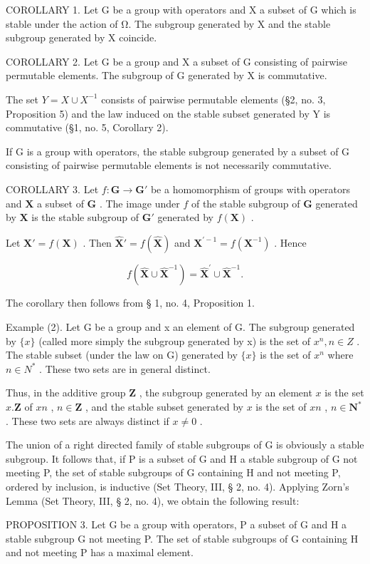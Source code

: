 COROLLARY 1. Let G be a group with operators and X a subset of G which is stable under the action of Ω. The subgroup generated by X and the stable subgroup generated by X coincide.

COROLLARY 2. Let G be a group and X a subset of G consisting of pairwise permutable elements. The subgroup of G generated by X is commutative.

The set \(Y = X \cup X^{-1}\) consists of pairwise permutable elements (§2, no. 3, Proposition 5) and the law induced on the stable subset generated by Y is commutative (§1, no. 5, Corollary 2).

If G is a group with operators, the stable subgroup generated by a subset of G consisting of pairwise permutable elements is not necessarily commutative.

COROLLARY 3. Let \(f: \mathbf{G} \to \mathbf{G}'\) be a homomorphism of groups with operators and \(\mathbf{X}\) a subset of \(\mathbf{G}\) . The image under \(f\) of the stable subgroup of \(\mathbf{G}\) generated by \(\mathbf{X}\) is the stable subgroup of \(\mathbf{G}'\) generated by \(f(\mathbf{X})\) .

Let \(\mathbf{X}' = f(\mathbf{X})\) . Then \(\hat{\mathbf{X}}' = f(\hat{\mathbf{X}})\) and \(\mathbf{X}^{\prime -1} = f(\mathbf{X}^{-1})\) . Hence

\[
f (\hat {\mathbf {X}} \cup \hat {\mathbf {X}} ^ {- 1}) = \hat {\mathbf {X}} ^ {\prime} \cup \hat {\mathbf {X}} ^ {- 1}.
\]

The corollary then follows from § 1, no. 4, Proposition 1.

Example (2). Let G be a group and x an element of G. The subgroup generated by \(\{x\}\) (called more simply the subgroup generated by x) is the set of \(x^{n}, n \in Z\) . The stable subset (under the law on G) generated by \(\{x\}\) is the set of \(x^{n}\) where \(n \in N^{*}\) . These two sets are in general distinct.

Thus, in the additive group \(\mathbf{Z}\) , the subgroup generated by an element \(x\) is the set \(x.\mathbf{Z}\) of \(xn\) , \(n \in \mathbf{Z}\) , and the stable subset generated by \(x\) is the set of \(xn\) , \(n \in \mathbf{N}^*\) . These two sets are always distinct if \(x \neq 0\) .

The union of a right directed family of stable subgroups of G is obviously a stable subgroup. It follows that, if P is a subset of G and H a stable subgroup of G not meeting P, the set of stable subgroups of G containing H and not meeting P, ordered by inclusion, is inductive (Set Theory, III, § 2, no. 4). Applying Zorn's Lemma (Set Theory, III, § 2, no. 4), we obtain the following result:

PROPOSITION 3. Let G be a group with operators, P a subset of G and H a stable subgroup G not meeting P. The set of stable subgroups of G containing H and not meeting P has a maximal element.

